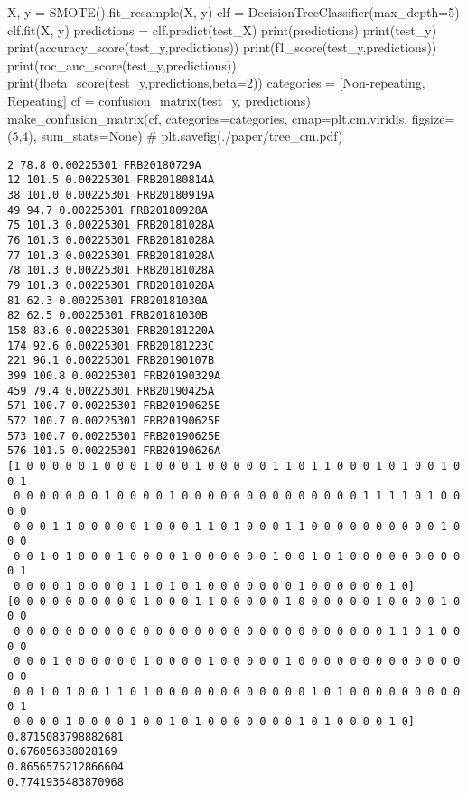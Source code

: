 \documentclass[
  letterpaper,
  DIV=11,
  numbers=noendperiod]{scrartcl}
\newenvironment{Shaded}{\begin{snugshade}}{\end{snugshade}}
\newcommand{\BuiltInTok}[1]{\textcolor[rgb]{0.00,0.23,0.31}{#1}}
\newcommand{\CommentTok}[1]{\textcolor[rgb]{0.37,0.37,0.37}{#1}}
\newcommand{\DecValTok}[1]{\textcolor[rgb]{0.68,0.00,0.00}{#1}}
\newcommand{\NormalTok}[1]{\textcolor[rgb]{0.00,0.23,0.31}{#1}}
\newcommand{\OperatorTok}[1]{\textcolor[rgb]{0.37,0.37,0.37}{#1}}
\newcommand{\StringTok}[1]{\textcolor[rgb]{0.13,0.47,0.30}{#1}}
\newcommand{\VariableTok}[1]{\textcolor[rgb]{0.07,0.07,0.07}{#1}}
\begin{document}
\begin{Shaded}
\begin{Highlighting}[]
\NormalTok{X, y }\OperatorTok{=}\NormalTok{ SMOTE().fit\_resample(X, y)}
\NormalTok{clf }\OperatorTok{=}\NormalTok{ DecisionTreeClassifier(max\_depth}\OperatorTok{=}\DecValTok{5}\NormalTok{)  }
\NormalTok{clf.fit(X, y)}
\NormalTok{predictions }\OperatorTok{=}\NormalTok{ clf.predict(test\_X)}
\BuiltInTok{print}\NormalTok{(predictions)}
\BuiltInTok{print}\NormalTok{(test\_y)}
\BuiltInTok{print}\NormalTok{(accuracy\_score(test\_y,predictions))}
\BuiltInTok{print}\NormalTok{(f1\_score(test\_y,predictions))}
\BuiltInTok{print}\NormalTok{(roc\_auc\_score(test\_y,predictions))}
\BuiltInTok{print}\NormalTok{(fbeta\_score(test\_y,predictions,beta}\OperatorTok{=}\DecValTok{2}\NormalTok{))}
\NormalTok{categories }\OperatorTok{=}\NormalTok{ [}\StringTok{\textquotesingle{}Non{-}repeating\textquotesingle{}}\NormalTok{, }\StringTok{\textquotesingle{}Repeating\textquotesingle{}}\NormalTok{]}
\NormalTok{cf }\OperatorTok{=}\NormalTok{ confusion\_matrix(test\_y, predictions)}
\NormalTok{make\_confusion\_matrix(cf, }
\NormalTok{                      categories}\OperatorTok{=}\NormalTok{categories,}
\NormalTok{                      cmap}\OperatorTok{=}\NormalTok{plt.cm.viridis,}
\NormalTok{                      figsize}\OperatorTok{=}\NormalTok{(}\DecValTok{5}\NormalTok{,}\DecValTok{4}\NormalTok{),}
\NormalTok{                      sum\_stats}\OperatorTok{=}\VariableTok{None}\NormalTok{)}
\CommentTok{\# plt.savefig(\textquotesingle{}./paper/tree\_cm.pdf\textquotesingle{})}
\end{Highlighting}
\end{Shaded}

\begin{verbatim}
2 78.8 0.00225301 FRB20180729A
12 101.5 0.00225301 FRB20180814A
38 101.0 0.00225301 FRB20180919A
49 94.7 0.00225301 FRB20180928A
75 101.3 0.00225301 FRB20181028A
76 101.3 0.00225301 FRB20181028A
77 101.3 0.00225301 FRB20181028A
78 101.3 0.00225301 FRB20181028A
79 101.3 0.00225301 FRB20181028A
81 62.3 0.00225301 FRB20181030A
82 62.5 0.00225301 FRB20181030B
158 83.6 0.00225301 FRB20181220A
174 92.6 0.00225301 FRB20181223C
221 96.1 0.00225301 FRB20190107B
399 100.8 0.00225301 FRB20190329A
459 79.4 0.00225301 FRB20190425A
571 100.7 0.00225301 FRB20190625E
572 100.7 0.00225301 FRB20190625E
573 100.7 0.00225301 FRB20190625E
576 101.5 0.00225301 FRB20190626A
[1 0 0 0 0 0 1 0 0 0 1 0 0 0 1 0 0 0 0 0 1 1 0 1 1 0 0 0 1 0 1 0 0 1 0 0 1
 0 0 0 0 0 0 0 1 0 0 0 0 1 0 0 0 0 0 0 0 0 0 0 0 0 0 0 1 1 1 1 0 1 0 0 0 0
 0 0 0 1 1 0 0 0 0 0 1 0 0 0 1 1 0 1 0 0 0 1 1 0 0 0 0 0 0 0 0 0 0 1 0 0 0
 0 0 1 0 1 0 0 0 1 0 0 0 0 1 0 0 0 0 0 0 1 0 0 1 0 1 0 0 0 0 0 0 0 0 0 0 1
 0 0 0 0 1 0 0 0 0 1 1 0 1 0 1 0 0 0 0 0 0 0 1 0 0 0 0 0 0 1 0]
[0 0 0 0 0 0 0 0 0 0 1 0 0 0 1 1 0 0 0 0 0 1 0 0 0 0 0 0 1 0 0 0 0 1 0 0 0
 0 0 0 0 0 0 0 0 0 0 0 0 0 0 0 0 0 0 0 0 0 0 0 0 0 0 0 0 0 1 1 0 1 0 0 0 0
 0 0 0 1 0 0 0 0 0 0 1 0 0 0 0 1 0 0 0 0 0 1 0 0 0 0 0 0 0 0 0 0 0 0 0 0 0
 0 0 1 0 1 0 0 1 1 0 1 0 0 0 0 0 0 0 0 0 0 0 0 1 0 1 0 0 0 0 0 0 0 0 0 0 1
 0 0 0 0 1 0 0 0 0 1 0 0 1 0 1 0 0 0 0 0 0 0 1 0 1 0 0 0 0 1 0]
0.8715083798882681
0.676056338028169
0.8656575212866604
0.7741935483870968
\end{verbatim}
\end{document}
